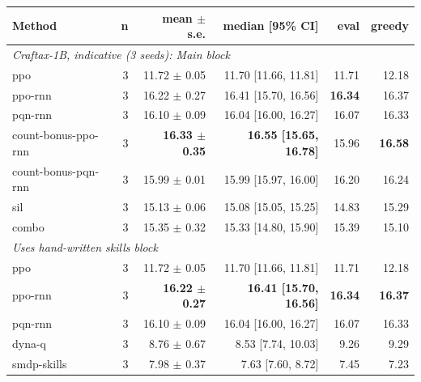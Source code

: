 \begin{tabular}{lrrrrr}
\toprule
Method & n & mean $\pm$ s.e. & median [95\% CI] & eval & greedy \\
\midrule
\multicolumn{6}{l}{\emph{Craftax-1B, indicative (3 seeds): Main block}} \\
ppo & 3 & 11.72 $\pm$ 0.05 & 11.70 [11.66, 11.81] & 11.71 & 12.18 \\
ppo-rnn & 3 & 16.22 $\pm$ 0.27 & 16.41 [15.70, 16.56] & \textbf{16.34} & 16.37 \\
pqn-rnn & 3 & 16.10 $\pm$ 0.09 & 16.04 [16.00, 16.27] & 16.07 & 16.33 \\
count-bonus-ppo-rnn & 3 & \textbf{16.33 $\pm$ 0.35} & \textbf{16.55 [15.65, 16.78]} & 15.96 & \textbf{16.58} \\
count-bonus-pqn-rnn & 3 & 15.99 $\pm$ 0.01 & 15.99 [15.97, 16.00] & 16.20 & 16.24 \\
sil & 3 & 15.13 $\pm$ 0.06 & 15.08 [15.05, 15.25] & 14.83 & 15.29 \\
combo & 3 & 15.35 $\pm$ 0.32 & 15.33 [14.80, 15.90] & 15.39 & 15.10 \\
\midrule
\multicolumn{6}{l}{\emph{Uses hand-written skills block}} \\
ppo & 3 & 11.72 $\pm$ 0.05 & 11.70 [11.66, 11.81] & 11.71 & 12.18 \\
ppo-rnn & 3 & \textbf{16.22 $\pm$ 0.27} & \textbf{16.41 [15.70, 16.56]} & \textbf{16.34} & \textbf{16.37} \\
pqn-rnn & 3 & 16.10 $\pm$ 0.09 & 16.04 [16.00, 16.27] & 16.07 & 16.33 \\
dyna-q & 3 & 8.76 $\pm$ 0.67 & 8.53 [7.74, 10.03] & 9.26 & 9.29 \\
smdp-skills & 3 & 7.98 $\pm$ 0.37 & 7.63 [7.60, 8.72] & 7.45 & 7.23 \\
\bottomrule
\end{tabular}
